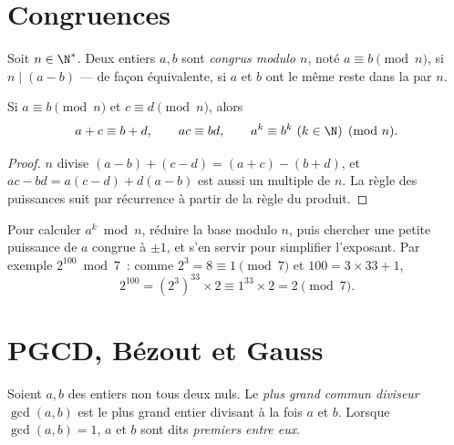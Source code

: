 \section{Congruences}

\begin{definition}[Congruence]\label{def:g12:arith:congruence}
Soit $n \in \N^*$. Deux entiers $a, b$ sont \emph{congrus modulo
$n$}, noté $a \equiv b \pmod n$, si $n \mid (a - b)$
--- de façon équivalente, si $a$ et $b$ ont le même reste dans la  par $n$.
\end{definition}

\begin{proposition}\label{prop:g12:arith:congops}
Si $a \equiv b \pmod n$ et $c \equiv d \pmod n$, alors
\[
a + c \equiv b + d, \qquad
ac \equiv bd, \qquad
a^k \equiv b^k \ (k \in \N) \pmod n .
\]
\end{proposition}

\begin{proof}
$n$ divise $(a-b) + (c-d) = (a+c) - (b+d)$, et
$ac - bd = a(c - d) + d(a - b)$ est aussi un multiple de $n$. La règle des
puissances suit par récurrence à partir de la règle du produit.
\end{proof}

\begin{method}\label{met:g12:arith:powers}
Pour calculer $a^k \bmod n$, réduire la base modulo $n$, puis chercher une
petite puissance de $a$ congrue à $\pm1$, et s'en servir pour simplifier
l'exposant. Par exemple $2^{100} \bmod 7$~: comme $2^3 = 8 \equiv 1 \pmod 7$
et $100 = 3\times33 + 1$,
\[
2^{100} = \left(2^{3}\right)^{33} \times 2 \equiv 1^{33}\times 2 = 2 \pmod 7 .
\]
\end{method}

\section{PGCD, Bézout et Gauss}

\begin{definition}[PGCD]\label{def:g12:arith:gcd}
Soient $a, b$ des entiers non tous deux nuls. Le \emph{plus grand commun
diviseur} $\gcd(a, b)$ est le plus grand entier divisant à la
fois $a$ et $b$. Lorsque $\gcd(a,b) = 1$, $a$ et $b$ sont dits
\emph{premiers entre eux}.
\end{definition}

